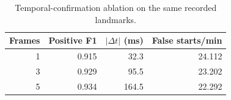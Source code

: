\begin{table}[t]
\centering
\small
\caption{Temporal-confirmation ablation on the same recorded landmarks.}
\label{tab:pinch_ablation}
\begin{tabular}{rrrr}
\hline
Frames & Positive F1 & $|\Delta t|$ (ms) & False starts/min \\
\hline
1 & 0.915 & 32.3 & 24.112 \\
3 & 0.929 & 95.5 & 23.202 \\
5 & 0.934 & 164.5 & 22.292 \\
\hline
\end{tabular}
\end{table}
